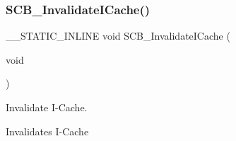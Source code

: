 \subsubsection{\texorpdfstring{S\+C\+B\+\_\+\+Invalidate\+I\+Cache()}{SCB\_InvalidateICache()}}
{\footnotesize\ttfamily \+\_\+\+\_\+\+S\+T\+A\+T\+I\+C\+\_\+\+I\+N\+L\+I\+NE void S\+C\+B\+\_\+\+Invalidate\+I\+Cache (\begin{DoxyParamCaption}\item[{void}]{ }\end{DoxyParamCaption})}



Invalidate I-\/\+Cache. 

Invalidates I-\/\+Cache 